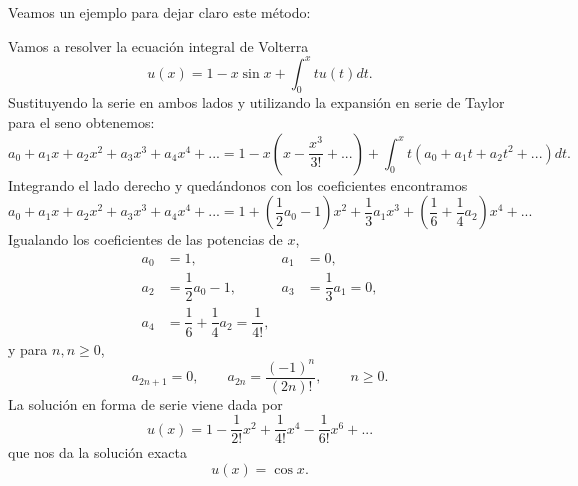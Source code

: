 Veamos un ejemplo para dejar claro este método:
\begin{ejemplo}
	Vamos a resolver la ecuación integral de Volterra
	\begin{equation}
		u(x) = 1 - x \sin x + \int_{0}^{x} tu(t)dt.
	\end{equation}
	Sustituyendo la serie en ambos lados y utilizando la expansión en serie de Taylor para el seno obtenemos:
	\begin{equation}
		a_0 + a_1x + a_2x^2 + a_3x^3 + a_4x^4 + ... = 1 - x(x-\dfrac{x^3}{3!} + ...) + \int_{0}^{x}t(a_0+a_1t+a_2t^2+...)dt.
	\end{equation}
	Integrando el lado derecho y quedándonos con los coeficientes encontramos
	\begin{equation}
		a_0 + a_1x + a_2x^2 + a_3x^3 + a_4x^4 + ... = 1+(\dfrac{1}{2}a_0-1)x^2+\dfrac{1}{3}a_1x^3+(\dfrac{1}{6}+\dfrac{1}{4}a_2)x^4+...
	\end{equation}
	Igualando los coeficientes de las potencias de $x$,
	\begin{align}
		a_0&=1,          &  a_1&=0,      \\
		a_2&=\dfrac{1}{2}a_0-1,   &  a_3&=\dfrac{1}{3}a_1 = 0, \\
		a_4&=\dfrac{1}{6}+\dfrac{1}{4}a_2 = \dfrac{1}{4!},
	\end{align}
	y para $n, n\geqslant0$,
	\begin{equation}
		a_{2n+1} = 0, \qquad a_{2n} = \dfrac{(-1)^n}{(2n)!}, \qquad n \geqslant 0.
	\end{equation}
	La solución en forma de serie viene dada por
	\begin{equation}
		u(x) = 1 - \dfrac{1}{2!}x^2 + \dfrac{1}{4!}x^4-\dfrac{1}{6!}x^6+...
	\end{equation}
	que nos da la solución exacta
	\begin{equation}
		u(x) = \cos x.
	\end{equation}
\end{ejemplo}



\endinput
